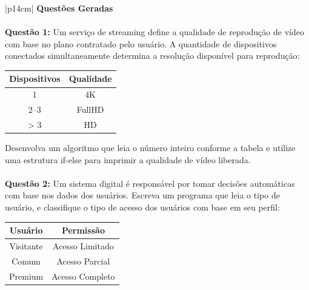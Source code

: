 \begin{table}[H]
    \centering
    \begin{tabular}{|p{14cm}|}
        \hline
        \textbf{Questões Geradas} \\ 
        \hline
        \\
        \textbf{Questão 1:} Um serviço de streaming define a qualidade de reprodução de vídeo com base no plano contratado pelo usuário. A quantidade de dispositivos conectados simultaneamente determina a resolução disponível para reprodução:
        \vspace{1em}
        
    
        
        \begin{minipage}{\linewidth}
        \centering
        \begin{tabular}{|c|c|}
                \hline
                \textbf{Dispositivos} & \textbf{Qualidade} \\
                \hline
                1 & 4K \\
                \hline
                2--3 & FullHD \\
                \hline
                > 3 & HD \\
                \hline
        \end{tabular}

    \end{minipage}

        \vspace{1em}

        Desenvolva um algoritmo que leia o número inteiro conforme a tabela e utilize uma estrutura if-else para imprimir a qualidade de vídeo liberada.\\[1em]
        \\
        \textbf{Questão 2:} Um sistema digital é responsável por tomar decisões automáticas com base nos dados dos usuários. Escreva um programa que leia o tipo de usuário, e classifique o tipo de acesso dos usuários com base em seu perfil:
        \vspace{1em}
        
    
        
        \begin{minipage}{\linewidth}
        \centering
        \begin{tabular}{|c|c|}
                \hline
                \textbf{Usuário} & \textbf{Permissão} \\
                \hline
                Visitante & Acesso Limitado \\
                \hline
                Comum & Acesso Parcial \\
                \hline
                Premium & Acesso Completo \\
                \hline
        \end{tabular}


\end{minipage}
\end{tabular}
\end{table}
